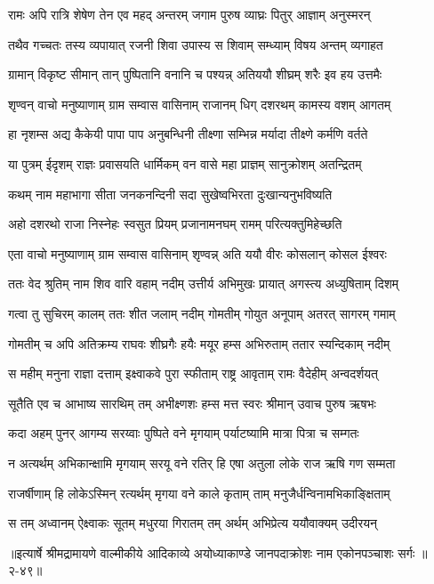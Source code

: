 
\twolineshloka
{रामः अपि रात्रि शेषेण तेन एव महद् अन्तरम्}
{जगाम पुरुष व्याघ्रः पितुर् आज्ञाम् अनुस्मरन्} %

\twolineshloka
{तथैव गच्चतः तस्य व्यपायात् रजनी शिवा}
{उपास्य स शिवाम् सम्ध्याम् विषय अन्तम् व्यगाहत} %

\twolineshloka
{ग्रामान् विकृष्ट सीमान् तान् पुष्पितानि वनानि च}
{पश्यन्न् अतिययौ शीघ्रम् शरैः इव हय उत्तमैः} %

\twolineshloka
{शृण्वन् वाचो मनुष्याणाम् ग्राम सम्वास वासिनाम्}
{राजानम् धिग् दशरथम् कामस्य वशम् आगतम्} %

\twolineshloka
{हा नृशम्स अद्य कैकेयी पापा पाप अनुबन्धिनी}
{तीक्ष्णा सम्भिन्न मर्यादा तीक्ष्णे कर्मणि वर्तते} %

\twolineshloka
{या पुत्रम् ईदृशम् राज्ञः प्रवासयति धार्मिकम्}
{वन वासे महा प्राज्ञम् सानुक्रोशम् अतन्द्रितम्} %

\twolineshloka
{कथम् नाम महाभागा सीता जनकनन्दिनी}
{सदा सुखेष्वभिरता दुःखान्यनुभविष्यति} %

\twolineshloka
{अहो दशरथो राजा निस्नेहः स्वसुत प्रियम्}
{प्रजानामनघम् रामम् परित्यक्तुमिहेच्छति} %

\twolineshloka
{एता वाचो मनुष्याणाम् ग्राम सम्वास वासिनाम्}
{शृण्वन्न् अति ययौ वीरः कोसलान् कोसल ईश्वरः} %

\twolineshloka
{ततः वेद श्रुतिम् नाम शिव वारि वहाम् नदीम्}
{उत्तीर्य अभिमुखः प्रायात् अगस्त्य अध्युषिताम् दिशम्} %

\twolineshloka
{गत्वा तु सुचिरम् कालम् ततः शीत जलाम् नदीम्}
{गोमतीम् गोयुत अनूपाम् अतरत् सागरम् गमाम्} %

\twolineshloka
{गोमतीम् च अपि अतिक्रम्य राघवः शीघ्रगैः हयैः}
{मयूर हम्स अभिरुताम् ततार स्यन्दिकाम् नदीम्} %

\twolineshloka
{स महीम् मनुना राज्ञा दत्ताम् इक्ष्वाकवे पुरा}
{स्फीताम् राष्ट्र आवृताम् रामः वैदेहीम् अन्वदर्शयत्} %

\twolineshloka
{सूतैति एव च आभाष्य सारथिम् तम् अभीक्ष्णशः}
{हम्स मत्त स्वरः श्रीमान् उवाच पुरुष ऋषभः} %

\twolineshloka
{कदा अहम् पुनर् आगम्य सरय्वाः पुष्पिते वने}
{मृगयाम् पर्याटष्यामि मात्रा पित्रा च सम्गतः} %

\twolineshloka
{न अत्यर्थम् अभिकान्क्षामि मृगयाम् सरयू वने}
{रतिर् हि एषा अतुला लोके राज ऋषि गण सम्मता} %

\twolineshloka
{राजर्षीणाम् हि लोकेऽस्मिन् रत्यर्थम् मृगया वने}
{काले कृताम् ताम् मनुजैर्धन्विनामभिकाङ्क्षिताम्} %

\onelineshloka
{स तम् अध्वानम् ऐक्ष्वाकः सूतम् मधुरया गिरातम् तम् अर्थम् अभिप्रेत्य ययौवाक्यम् उदीरयन्} %


॥इत्यार्षे श्रीमद्रामायणे वाल्मीकीये आदिकाव्ये अयोध्याकाण्डे जानपदाक्रोशः नाम एकोनपञ्चाशः सर्गः ॥२-४९॥
